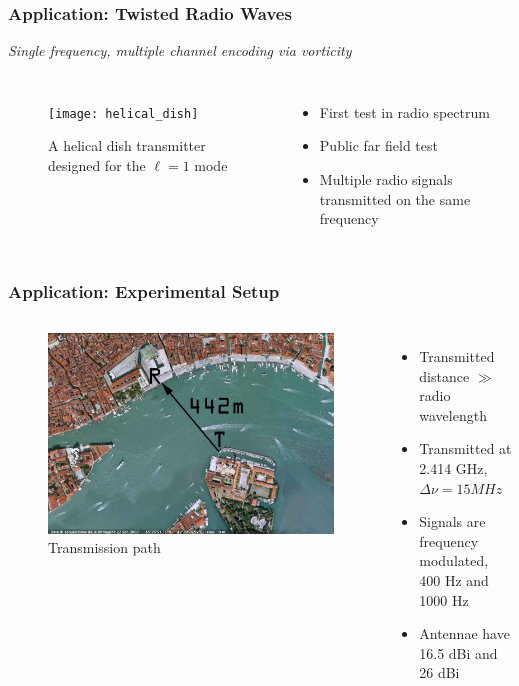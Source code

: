 \documentclass[xcolor=dvipsnames]{beamer}
\newenvironment{items}[1][]
{\begin{itemize}
    \ifthenelse{\isempty{#1}}
    {\setlength{\itemsep}{12pt}}{\setlength{\itemsep}{#1}}}
  {\end{itemize}}
\begin{document}
\begin{frame}
        \frametitle{Application: Twisted Radio Waves}
        \begin{center}
                \emph{Single frequency, multiple channel encoding via vorticity}
        \end{center}
  \begin{columns}[c]
    \begin{figure}
      \texttt{[image: helical\_dish]}
      \caption{A helical dish transmitter designed for the $\ell=1$
        mode}
      \label{pic:dish}
    \end{figure}
                \begin{items}
                \item First test in radio spectrum
                \item Public far field test
                \item Multiple radio signals transmitted on the same frequency
                \end{items}
        \end{columns}
\end{frame}

\begin{frame}
        \frametitle{Application: Experimental Setup}
  \begin{columns}[c]
                \begin{figure}
      \includegraphics[width=\textwidth]{birdeyeview}
      \caption{Transmission path}
      \label{pic:birdeye}
                \end{figure}
                \begin{items}
                \item Transmitted distance $\gg$ radio wavelength
                \item Transmitted at 2.414 GHz, $\Delta \nu = 15MHz$
                \item Signals are frequency modulated, 400 Hz and 1000 Hz
                \item Antennae have 16.5 dBi and 26 dBi
                \end{items}
  \end{columns}
\end{frame}
\end{document}
